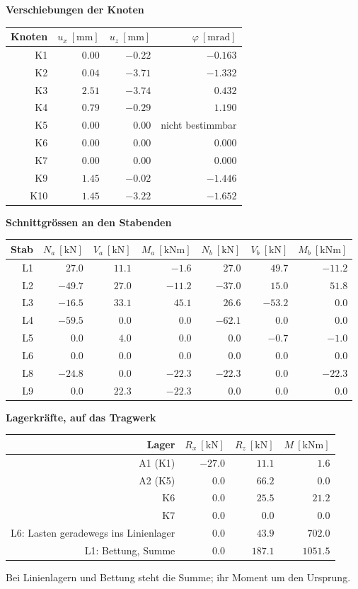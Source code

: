 \documentclass[11pt,a4paper]{article}
\begin{document}
\noindent\textbf{Verschiebungen der Knoten}
\begin{longtable}{rrrr}
\hline
Knoten & $u_x\ [\mathrm{mm}]$ & $u_z\ [\mathrm{mm}]$ & $\varphi\ [\mathrm{mrad}]$ \\
\hline
\endhead
K1 & $0.00$ & $-0.22$ & $-0.163$ \\
K2 & $0.04$ & $-3.71$ & $-1.332$ \\
K3 & $2.51$ & $-3.74$ & $0.432$ \\
K4 & $0.79$ & $-0.29$ & $1.190$ \\
K5 & $0.00$ & $0.00$ & nicht bestimmbar \\
K6 & $0.00$ & $0.00$ & $0.000$ \\
K7 & $0.00$ & $0.00$ & $0.000$ \\
K9 & $1.45$ & $-0.02$ & $-1.446$ \\
K10 & $1.45$ & $-3.22$ & $-1.652$ \\
\hline
\end{longtable}
\noindent\textbf{Schnittgrössen an den Stabenden}
\begin{longtable}{rrrrrrr}
\hline
Stab & $N_{a}\ [\mathrm{kN}]$ & $V_{a}\ [\mathrm{kN}]$ & $M_{a}\ [\mathrm{kNm}]$ & $N_{b}\ [\mathrm{kN}]$ & $V_{b}\ [\mathrm{kN}]$ & $M_{b}\ [\mathrm{kNm}]$ \\
\hline
\endhead
L1 & $27.0$ & $11.1$ & $-1.6$ & $27.0$ & $49.7$ & $-11.2$ \\
L2 & $-49.7$ & $27.0$ & $-11.2$ & $-37.0$ & $15.0$ & $51.8$ \\
L3 & $-16.5$ & $33.1$ & $45.1$ & $26.6$ & $-53.2$ & $0.0$ \\
L4 & $-59.5$ & $0.0$ & $0.0$ & $-62.1$ & $0.0$ & $0.0$ \\
L5 & $0.0$ & $4.0$ & $0.0$ & $0.0$ & $-0.7$ & $-1.0$ \\
L6 & $0.0$ & $0.0$ & $0.0$ & $0.0$ & $0.0$ & $0.0$ \\
L8 & $-24.8$ & $0.0$ & $-22.3$ & $-22.3$ & $0.0$ & $-22.3$ \\
L9 & $0.0$ & $22.3$ & $-22.3$ & $0.0$ & $0.0$ & $0.0$ \\
\hline
\end{longtable}
\noindent\textbf{Lagerkräfte, auf das Tragwerk}
\begin{longtable}{rrrr}
\hline
Lager & $R_x\ [\mathrm{kN}]$ & $R_z\ [\mathrm{kN}]$ & $M\ [\mathrm{kNm}]$ \\
\hline
\endhead
A1 (K1) & $-27.0$ & $11.1$ & $1.6$ \\
A2 (K5) & $0.0$ & $66.2$ & $0.0$ \\
K6 & $0.0$ & $25.5$ & $21.2$ \\
K7 & $0.0$ & $0.0$ & $0.0$ \\
L6: Lasten geradewegs ins Linienlager & $0.0$ & $43.9$ & $702.0$ \\
L1: Bettung, Summe & $0.0$ & $187.1$ & $1051.5$ \\
\hline
\end{longtable}
Bei Linienlagern und Bettung steht die Summe; ihr Moment um den Ursprung.
\end{document}
